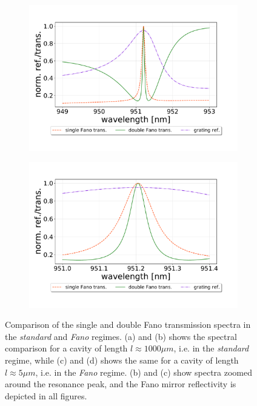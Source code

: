 \begin{figure}[h!]
\begin{subfigure}[c]{0.49\textwidth}
        \caption{}
        \label{fig:double_in_standard_regime_zoomed}
    \end{subfigure}
    \begin{subfigure}[c]{0.49\textwidth}
        \centering
        \includegraphics[width=\textwidth]{figures/single_and_double_5um.pdf}
        \caption{}
        \label{fig:double_in_fano_regime}
    \end{subfigure}
    \begin{subfigure}[c]{0.49\textwidth}
        \includegraphics[width=\textwidth]{figures/single_and_double_5um_zoomed.pdf}
        \caption{}
        \label{fig:double_in_fano_regime_zoomed}
    \end{subfigure}
    \caption{Comparison of the single and double Fano transmission spectra in the \emph{standard} and \emph{Fano} regimes. (a) and (b) shows the spectral comparison for a cavity of length $l \approx 1000 \mu m$, i.e. in the \emph{standard} regime, while (c) and (d) shows the same for a cavity of length $l \approx 5 \mu m$, i.e. in the \emph{Fano} regime. (b) and (c) show spectra zoomed around the resonance peak, and the Fano mirror reflectivity is depicted in all figures.}
    \label{fig:double_in_standard_and_fano_regimes}
\end{figure}


